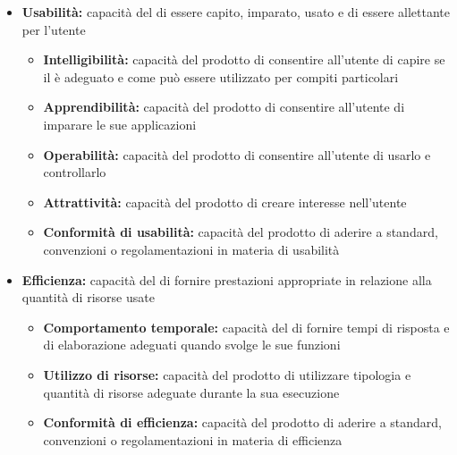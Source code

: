 \documentclass[12pt,a4paper]{article}
\begin{document}
\begin{itemize}
	\item \textbf{Usabilità:} capacità del  di essere capito, imparato, usato e di essere allettante per l'utente
	\begin{itemize}
		\item \textbf{Intelligibilità:} capacità del prodotto  di consentire all'utente di capire se il  è adeguato e come può essere utilizzato per compiti	particolari
		\item \textbf{Apprendibilità:} capacità del prodotto  di consentire all'utente di imparare le sue applicazioni
		\item \textbf{Operabilità:} capacità del prodotto  di consentire all'utente di usarlo e controllarlo
		\item \textbf{Attrattività:} capacità del prodotto  di creare interesse nell'utente
		\item \textbf{Conformità di usabilità:} capacità del prodotto  di aderire a standard, convenzioni o regolamentazioni in materia di usabilità
	\end{itemize}
	
	\item \textbf{Efficienza:} capacità del  di fornire prestazioni appropriate in relazione alla quantità di risorse usate
	\begin{itemize}
		\item \textbf{Comportamento temporale:} capacità del  di fornire tempi di risposta e di elaborazione adeguati quando svolge le sue funzioni
		\item \textbf{Utilizzo di risorse:} capacità del prodotto  di utilizzare tipologia e quantità di risorse adeguate durante la sua esecuzione
		\item \textbf{Conformità di efficienza:} capacità del prodotto  di aderire a standard, convenzioni o regolamentazioni in materia di efficienza
	\end{itemize}
	

\end{itemize}
\end{document}

